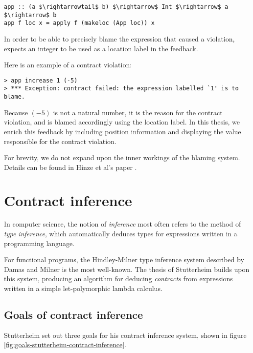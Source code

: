 \documentclass[10pt]{report}
\newcommand{\code}[1]{%
  {%
   \setlength{\fboxsep}{-2\fboxrule}%
   \fcolorbox{black}{light-gray}{\hspace{1.5pt}\strut\texttt{#1}\hspace{1.5pt}}%
  }%
}
\begin{document}
\begin{lstlisting}[mathescape]
app :: (a $\rightarrowtail$ b) $\rightarrow$ Int $\rightarrow$ a $\rightarrow$ b
app f loc x = apply f (makeloc (App loc)) x
\end{lstlisting}

In order to be able to precisely blame the expression that caused a violation, \code{app} expects an integer to be used as a location label in the feedback.

Here is an example of a contract violation:

\begin{lstlisting}[mathescape]
> app increase 1 (-5)
> *** Exception: contract failed: the expression labelled `1' is to blame.
\end{lstlisting}

Because $(-5)$ is not a natural number, it is the reason for the contract violation, and is blamed accordingly using the location label.
In this thesis, we enrich this feedback by including position information and displaying the value responsible for the contract violation.

For brevity, we do not expand upon the inner workings of the blaming system.
Details can be found in Hinze et al's paper \cite{Hinze06typedcontracts}.

\section{Contract inference}
\label{background-inference}

In computer science, the notion of \textit{inference} most often refers to the method of \textit{type inference}, which automatically deduces types for expressions written in a programming language.

For functional programs, the Hindley-Milner type inference system described by Damas and Milner \cite{Damas:1982ve} is the most well-known.
The thesis of Stutterheim \cite{Stutterheim:2013:thesis} builds upon this system, producing an algorithm for deducing \textit{contracts} from expressions written in a simple let-polymorphic lambda calculus.

\subsection{Goals of contract inference}
Stutterheim set out three goals for his contract inference system, shown in figure \ref{fig:goals-stutterheim-contract-inference}.
\end{document}
